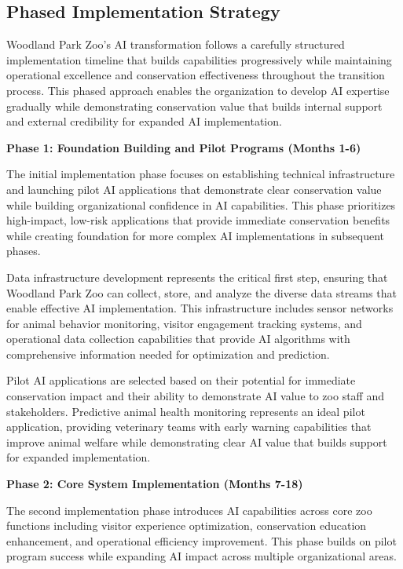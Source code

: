 \documentclass[
  Letterpaper,
]{scrbook}
\begin{document}
\subsection{Phased Implementation
Strategy}\label{phased-implementation-strategy}

Woodland Park Zoo's AI transformation follows a carefully structured
implementation timeline that builds capabilities progressively while
maintaining operational excellence and conservation effectiveness
throughout the transition process. This phased approach enables the
organization to develop AI expertise gradually while demonstrating
conservation value that builds internal support and external credibility
for expanded AI implementation.

\textbf{Phase 1: Foundation Building and Pilot Programs (Months 1-6)}

The initial implementation phase focuses on establishing technical
infrastructure and launching pilot AI applications that demonstrate
clear conservation value while building organizational confidence in AI
capabilities. This phase prioritizes high-impact, low-risk applications
that provide immediate conservation benefits while creating foundation
for more complex AI implementations in subsequent phases.

Data infrastructure development represents the critical first step,
ensuring that Woodland Park Zoo can collect, store, and analyze the
diverse data streams that enable effective AI implementation. This
infrastructure includes sensor networks for animal behavior monitoring,
visitor engagement tracking systems, and operational data collection
capabilities that provide AI algorithms with comprehensive information
needed for optimization and prediction.

Pilot AI applications are selected based on their potential for
immediate conservation impact and their ability to demonstrate AI value
to zoo staff and stakeholders. Predictive animal health monitoring
represents an ideal pilot application, providing veterinary teams with
early warning capabilities that improve animal welfare while
demonstrating clear AI value that builds support for expanded
implementation.

\textbf{Phase 2: Core System Implementation (Months 7-18)}

The second implementation phase introduces AI capabilities across core
zoo functions including visitor experience optimization, conservation
education enhancement, and operational efficiency improvement. This
phase builds on pilot program success while expanding AI impact across
multiple organizational areas.
\end{document}
